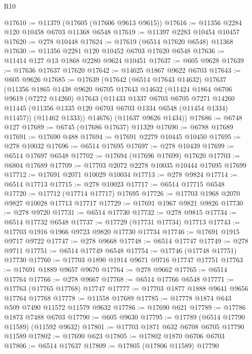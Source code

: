 \begin{lexlean}{R10}
\begin{coremodule}
{{{{{{{{{{{{{{{{{{{{{{{{{{{{{{{{{{{{{{{{{{{{{{{{{{{{{{{{{{{{{{{{{{{{{{{{{{{{{{{{{{{{@17610 := @11379 (@17605 (@17606 @9613 @9615))
@17616 := @11356 @2284 @120 @10458 @6703 @11368 @6548
@17619 := @11397 @2283 @10454 @10457
@17620 := @278 @10448
@17624 := @17619 (@6514 @17620 @6548) @11368
@17630 := @11356 @2281 @120 @10452 @6703 @17620 @6548
@17636 := @11414 @127 @13 @1868 @2280 @9624 @10451
@17637 := @605 @9628
@17639 := @17636 @17637 @17620
@17642 := @14625 @1867 @9622 @6703
@17643 := @605 @9626
@17685 := @17639
    (@17642
      (@6514 @17643 @14632)
      @17637
      (@11356
        @1865
        @1438
        @9620
        @6705
        @17643
        @14632
        (@11424
          @1864
          @6706
          @9619
          (@7272 @14260)
          @17643
          (@11433
            @1337
            @6703
            @6705
            @7271
            @14260
            @11445
            (@11356 @1335 @120 @6703 @6703 @1334 @6548 (@11454 @1334) @11457))
          (@11462 @1333))
        @14676)
      (@11637 @9626 @1434))
@17686 := @6748 @127
@17689 := @6745 (@17686 @17637) @11329
@17690 := @6788 @17689
@17691 := @17690 @488
@17694 := @17691 @2279 @10445 @10450
@17695 := @278 @10032
@17696 := @6514 @17695
@17697 := @278 @10439
@17699 := @6514 @17697 @6548
@17702 := @17694 (@17696 @17699) @17620
@17703 := @6804 @17689
@17709 := @17703 @2072 @2278 @10035 @10444 @17695 @17699
@17712 := @17691 @2071 @10029 @10034
@17713 := @278 @9824
@17714 := @6514 @17713
@17715 := @278 @10023
@17717 := @6514 @17715 @6548
@17720 := @17712 (@17714 @17717) @17695
@17726 := @17703 @1968 @2070 @9827 @10028 @17713 @17717
@17729 := @17691 @1967 @9821 @9826
@17730 := @278 @9720
@17731 := @6514 @17730
@17732 := @278 @9815
@17734 := @6514 @17732 @6548
@17737 := @17729 (@17731 @17734) @17713
@17743 := @17703 @1916 @1966 @9723 @9820 @17730 @17734
@17746 := @17691 @1915 @9717 @9722
@17747 := @278 @9668
@17748 := @6514 @17747
@17749 := @278 @9711
@17751 := @6514 @17749 @6548
@17754 := @17746 (@17748 @17751) @17730
@17760 := @17703 @1890 @1914 @9671 @9716 @17747 @17751
@17763 := @17691 @1889 @9657 @9670
@17764 := @278 @9662
@17765 := @6514 @17764
@17766 := @278 @9667
@17768 := @6514 @17766 @6548
@17771 := @17763 (@17765 @17768) @17747
@17777 := @17703 @1877 @1888 @9641 @9656 @17764 @17768
@17778 := @11558 @17689
@17785 := @17778 @1874 @643 @509 @7490 @11572 @11579 @9632
@17786 := @17690 @621
@17789 := @17786 @1873 @7488 @6703
@17790 := @605 @9630
@17795 := @17789 (@6514 @17790 @11589) (@11592 @9632)
@17801 := @17703 @1871 @632 @6708 @6705 @17790 @11589
@17802 := @17690 @623
@17805 := @17802 @1870 @6706 @6703
@17806 := @6514 @17637
@17809 := @17805 (@17806 @11589) @17790
}}}}}}}}}}}}}}}}}}}}}}}}}}}}}}}}}}}}}}}}}}}}}}}}}}}}}}}}}}}}}}}}}}}}}}}}}}}}}}}}}}}}
\end{coremodule}
\end{lexlean}

